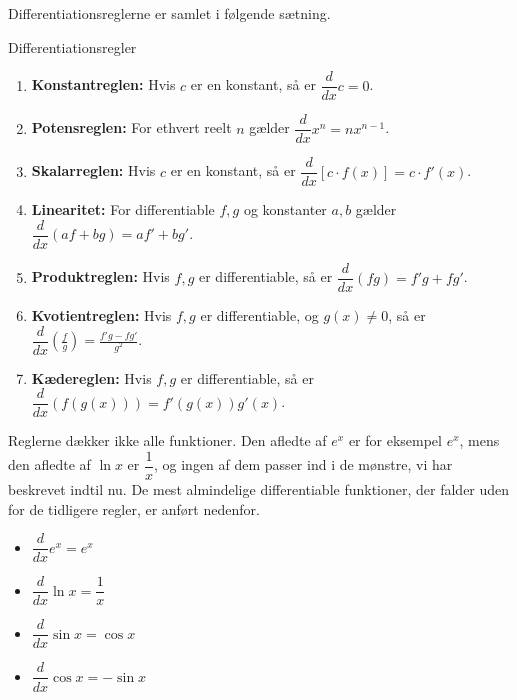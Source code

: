 Differentiationsreglerne er samlet i følgende sætning.

\begin{theorem}{Differentiationsregler}

    \begin{enumerate}
        \item \textbf{Konstantreglen:} Hvis $c$ er en konstant, så er $\dfrac{d}{dx}c=0$. \vspace{0.5em}
        \item \textbf{Potensreglen:} For ethvert reelt $n$ gælder $\dfrac{d}{dx}x^n = n x^{n-1}$. \vspace{0.5em}
        \item \textbf{Skalarreglen:} Hvis $c$ er en konstant, så er $\dfrac{d}{dx}[c \cdot f(x)] = c \cdot f'(x)$. \vspace{0.5em}
        \item \textbf{Linearitet:} For differentiable $f,g$ og konstanter $a,b$ gælder $\dfrac{d}{dx}(a f + b g) = a f' + b g'$. \vspace{0.5em}
        \item \textbf{Produktreglen:} Hvis $f,g$ er differentiable, så er $\dfrac{d}{dx}(f g) = f'g + fg'$. \vspace{0.5em}
        \item \textbf{Kvotientreglen:} Hvis $f,g$ er differentiable, og $g(x)\neq0$, så er $\dfrac{d}{dx}\left(\frac{f}{g}\right) = \frac{f'g - fg'}{g^2}$. \vspace{0.5em}
        \item \textbf{Kædereglen:} Hvis $f,g$ er differentiable, så er $\dfrac{d}{dx}(f(g(x))) = f'(g(x))g'(x)$. \vspace{0.5em}
    \end{enumerate}

\end{theorem}

Reglerne dækker ikke alle funktioner. Den afledte af $e^{x}$ er for eksempel $e^{x}$, mens den afledte af $\ln x$ er $\dfrac{1}{x}$, og ingen af dem passer ind i de mønstre, vi har beskrevet indtil nu. De mest almindelige differentiable funktioner, der falder uden for de tidligere regler, er anført nedenfor.


\begin{itemize}
    \item $\dfrac{d}{dx}e^x = e^x$\vspace{0.5em}
    \item $\dfrac{d}{dx}\ln x = \dfrac{1}{x}$\vspace{0.5em}
    \item $\dfrac{d}{dx}\sin x = \cos x$\vspace{0.5em}
    \item $\dfrac{d}{dx}\cos x = -\sin x$
\end{itemize}

